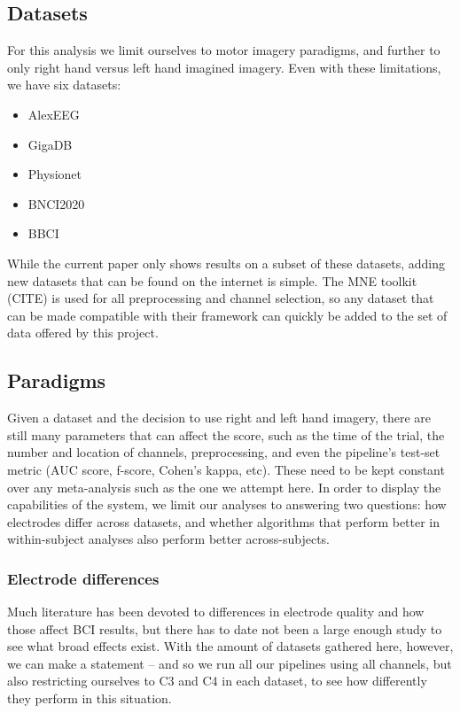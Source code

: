 \subsection{Datasets}

For this analysis we limit ourselves to motor imagery paradigms, and further to only right hand versus left hand imagined imagery. Even with these limitations, we have six datasets:

\begin{itemize}
\item AlexEEG\cite{Barachant2012a}
\item GigaDB \cite{Cho2017}
\item Physionet\cite{Schalk2004,Goldberger2000} 
\item BNCI2020
\item BBCI \cite{Blankertz2007,Shin2017}
\end{itemize}

While the current paper only shows results on a subset of these datasets, adding new datasets that can be found on the internet is simple. The MNE toolkit (CITE) is used for all preprocessing and channel selection, so any dataset that can be made compatible with their framework can quickly be added to the set of data offered by this project.
\subsection{Paradigms}

Given a dataset and the decision to use right and left hand imagery, there are
still many parameters that can affect the score, such as the time of the trial,
the number and location of channels, preprocessing, and even the pipeline's
test-set metric (AUC score, f-score, Cohen's kappa, etc). These need to be kept
constant over any meta-analysis such as the one we attempt here. In order to
display the capabilities of the system, we limit our analyses to answering two questions:
how electrodes differ across datasets, and whether algorithms that perform better in within-subject analyses also perform better across-subjects.

\subsubsection{Electrode differences}
Much literature has been devoted to differences in electrode quality and how those affect BCI results, but there has to date not been a large enough study to see what broad effects exist. With the amount of datasets gathered here, however, we can make a statement -- and so we run all our pipelines using all channels, but also restricting ourselves to C3 and C4 in each dataset, to see how differently they perform in this situation.

